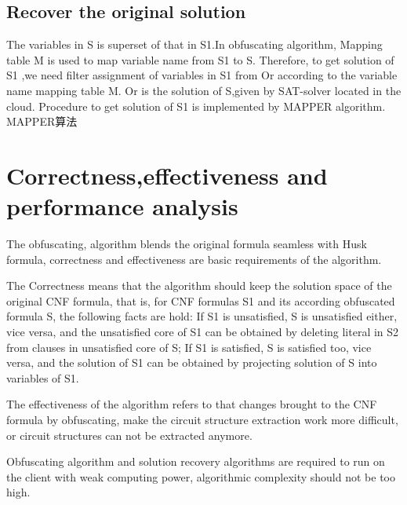 \documentclass[runningheads,a4paper]{llncs}
\begin{document}
\subsection{Recover the original solution}
The variables in S is superset of that in S1.In obfuscating algorithm, Mapping table M is used to map variable name from S1 to S. Therefore, to get solution of S1 ,we need filter assignment of variables in S1 from Or according to the variable name mapping table M. Or is the solution of S,given by SAT-solver located in the cloud. Procedure to get solution of S1 is implemented by MAPPER algorithm.
MAPPER算法

\section{Correctness,effectiveness and performance analysis}
The obfuscating, algorithm blends the original formula seamless with Husk formula, correctness and effectiveness are basic requirements of the algorithm. 

The Correctness means that the algorithm should keep the solution space of the original CNF formula, that is, for CNF formulas S1 and its according obfuscated formula S, the following facts are hold: If S1 is unsatisfied, S is unsatisfied either, vice versa, and the unsatisfied core of S1 can be obtained by deleting literal in S2  from clauses in unsatisfied core of S; If S1 is satisfied, S is satisfied too, vice versa, and the solution of S1 can be obtained by projecting solution of S into variables of S1. 

The effectiveness of the algorithm refers to that changes brought to the CNF formula by obfuscating, make the circuit structure extraction work more difficult, or circuit structures can not be extracted anymore. 

Obfuscating algorithm and solution recovery algorithms are required to run on the client with weak computing power, algorithmic complexity should not be too high.
\end{document}
